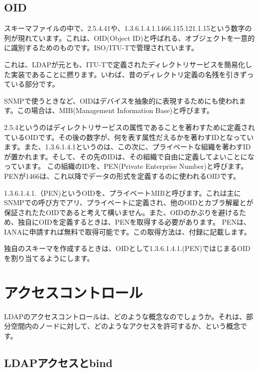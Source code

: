 \subsection{OID}

スキーマファイルの中で、2.5.4.41や、1.3.6.1.4.1.1466.115.121.1.15という数字の列が現れています。これは、OID(Object ID)と呼ばれる、オブジェクトを一意的に識別するためのものです。ISO/ITU-Tで管理されています。

これは、LDAPが元とも、ITU-Tで定義されたディレクトリサービスを簡易化した実装であることに撚ります。いわば、昔のディレクトリ定義の名残を引きずっている部分です。

SNMPで使うときなど、OIDはデバイスを抽象的に表現するためにも使われます。この場合は、MIB(Management Information Base)と呼びます。

2.5.4というのはディレクトリサービスの属性であることを著わすために定義されているOIDです。その後の数字が、何を表す属性だえるかを著わすIDとなっています。また、1.3.6.1.4.1というのは、この次に、プライベートな組織を著わすIDが置かれます。そして、その先のIDは、その組織で自由に定義してよいことになっています。
この組織のIDを、PEN(Private Enterprise Number)と呼びます。PENが1466は、これ以降でデータの形式を定義するのに使われるOIDです。

1.3.6.1.4.1.（PEN)というOIDを、プライベートMIBと呼びます。これは主にSNMPでの呼び方でアリ、プライベートに定義され、他のOIDとカブラ解雇とが保証されたたOIDであると考えて構いません。また、OIDのかぶりを避けるため、独自にOIDを定義するときは、PENを取得する必要があります。
PENは、IANAに申請すれば無料で取得可能です。この取得方法は、付録に記載します。

独自のスキーマを作成するときは、OIDとして1.3.6.1.4.1.(PEN)ではじまるOIDを割り当てるようにします。





\section{アクセスコントロール}

LDAPのアクセスコントロールは、どのような概念なのでしょうか。それは、部分空間内のノードに対して、どのようなアクセスを許可するか、という概念です。



\subsection{LDAPアクセスとbind}

